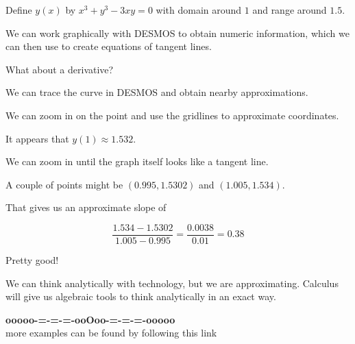 \documentclass{ximera}
\begin{document}
\begin{example}

Define $y(x)$ by $x^3 + y^3 - 3 x y = 0$ with domain around $1$ and range around $1.5$.


We can work graphically with DESMOS to obtain numeric information, which we can then use to create equations of tangent lines.







\begin{center}
\end{center}



What about a derivative?

We can trace the curve in DESMOS and obtain nearby approximations.


We can zoom in on the point and use the gridlines to approximate coordinates.






\begin{center}
\end{center}

It appears that $y(1) \approx 1.532$.



We can zoom in until the graph itself looks like a tangent line.



\begin{center}
\end{center}

A couple of points might be $(0.995, 1.5302)$ and $(1.005, 1.534)$.

That gives us an approximate slope of 

\[
\frac{1.534 - 1.5302}{1.005 - 0.995} = \frac{0.0038}{0.01} = 0.38
\]


Pretty good!


\end{example}



We can think analytically with technology, but we are approximating.  Calculus will give us algebraic tools to think analytically in an exact way.






\begin{center}
\textbf{\textcolor{green!50!black}{ooooo-=-=-=-ooOoo-=-=-=-ooooo}} \\

more examples can be found by following this link\\ 

\end{center}
\end{document}
